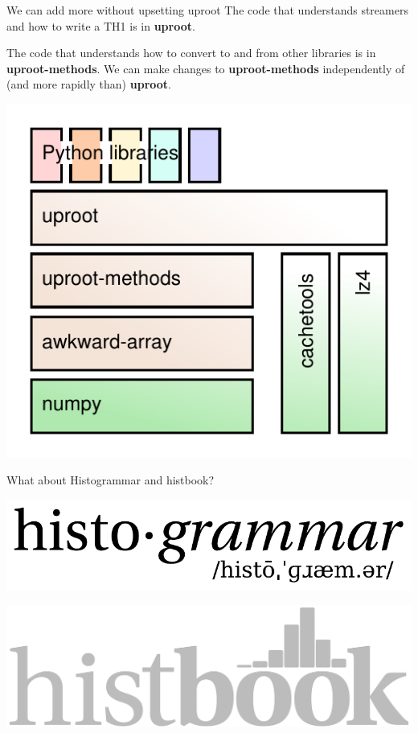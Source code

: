 \documentclass[aspectratio=169]{beamer}
\begin{document}
\begin{frame}{We can add more without upsetting uproot}
\large
\vspace{0.35 cm}
The code that understands streamers and how to write a TH1 is in {\bf uproot}.

\vspace{0.5 cm}
The code that understands how to convert to and from other libraries is in {\bf uproot-methods}. We can make changes to {\bf uproot-methods} independently of (and more rapidly than) {\bf uproot}.

\begin{center}
\includegraphics[width=0.4\linewidth]{abstraction-layers.pdf}
\end{center}
\end{frame}

\begin{frame}{What about Histogrammar and histbook?}
\vspace{0.25 cm}
\begin{center}
\includegraphics[width=0.55\linewidth]{histogrammar-logo-paths.pdf}

\vspace{1 cm}
\includegraphics[width=0.45\linewidth]{histbook-logo.pdf}
\end{center}
\end{frame}
\end{document}
